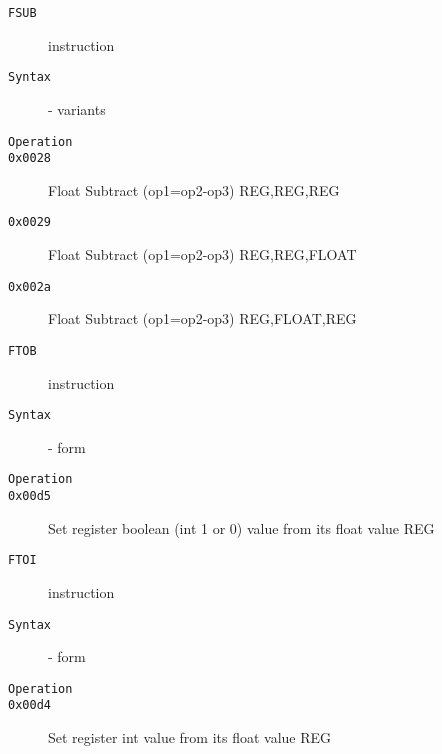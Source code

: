 \clearpage
\begin{description}
\item[\texttt{FSUB}] instruction\\
\item[\texttt{Syntax}] - variants\\

\item[\texttt{Operation}]
\item[\texttt{}]
\item[\texttt{0x0028}] Float Subtract (op1=op2-op3)  {REG,REG,REG}       \\
\item[\texttt{0x0029}] Float Subtract (op1=op2-op3)  {REG,REG,FLOAT}     \\
\item[\texttt{0x002a}] Float Subtract (op1=op2-op3)  {REG,FLOAT,REG}     \\
\end{description}
\clearpage
\begin{description}
\item[\texttt{FTOB}] instruction\\
\item[\texttt{Syntax}] - form \\

\item[\texttt{Operation}]
\item[\texttt{}]
\item[\texttt{0x00d5}] Set register boolean (int 1 or 0) value from its float value  {REG}               \\
\end{description}
\clearpage
\begin{description}
\item[\texttt{FTOI}] instruction\\
\item[\texttt{Syntax}] - form \\

\item[\texttt{Operation}]
\item[\texttt{}]
\item[\texttt{0x00d4}] Set register int value from its float value  {REG}               \\
\end{description}
